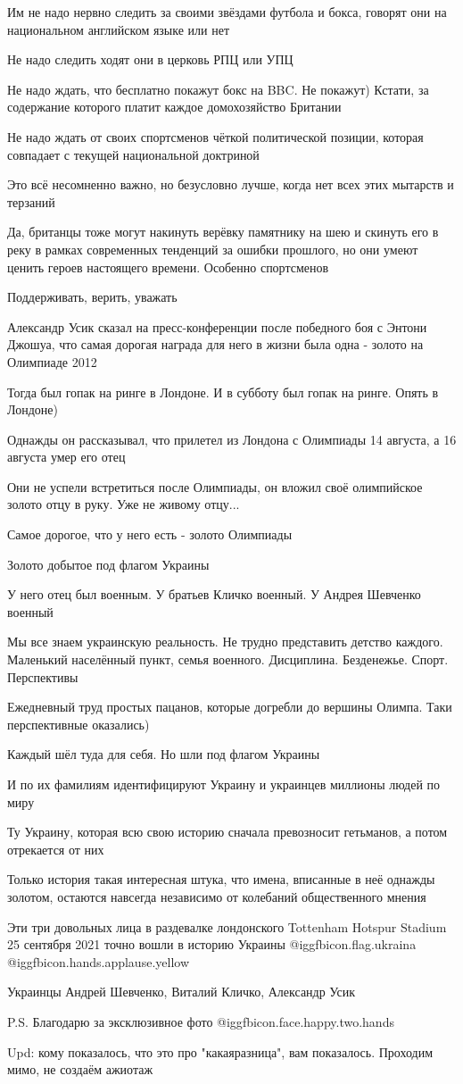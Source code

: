 Им не надо нервно следить за своими звёздами футбола и бокса, говорят они на
национальном английском языке или нет 

Не надо следить ходят они в церковь РПЦ или УПЦ

Не надо ждать, что бесплатно покажут бокс на BBC. Не покажут) Кстати, за
содержание которого платит каждое домохозяйство Британии

Не надо ждать от своих спортсменов чёткой политической позиции, которая
совпадает с текущей национальной доктриной

Это всё несомненно важно, но безусловно лучше, когда нет всех этих мытарств и
терзаний

Да, британцы тоже могут накинуть верёвку памятнику на шею и скинуть его в реку
в рамках современных тенденций за ошибки прошлого, но они умеют ценить героев
настоящего времени. Особенно спортсменов 

Поддерживать, верить, уважать 

Александр Усик сказал на пресс-конференции после победного боя с Энтони Джошуа,
что самая дорогая награда для него в жизни была одна - золото на Олимпиаде 2012

Тогда был гопак на ринге в Лондоне. И в субботу был гопак на ринге. Опять в
Лондоне) 

Однажды он рассказывал, что прилетел из Лондона с Олимпиады 14 августа, а 16
августа умер его отец

Они не успели встретиться после Олимпиады, он вложил своё олимпийское золото
отцу в руку. Уже не живому отцу...

Самое дорогое, что у него есть - золото Олимпиады 

Золото добытое под флагом Украины 

У него отец был военным. У братьев Кличко военный. У Андрея Шевченко военный

Мы все знаем украинскую реальность. Не трудно представить детство каждого.
Маленький населённый пункт, семья военного. Дисциплина. Безденежье. Спорт.
Перспективы 

Ежедневный труд простых пацанов, которые догребли до вершины Олимпа. Таки
перспективные оказались) 

Каждый шёл туда для себя. Но шли под флагом Украины 

И по их фамилиям идентифицируют Украину и украинцев миллионы людей по миру 

Ту Украину, которая всю свою историю сначала превозносит гетьманов, а потом
отрекается от них 

Только история такая интересная штука, что имена,  вписанные в неё однажды
золотом, остаются навсегда независимо от колебаний общественного мнения

Эти три довольных лица в раздевалке лондонского Tottenham Hotspur Stadium 25
сентября 2021 точно вошли в историю Украины  @igg{fbicon.flag.ukraina}
@igg{fbicon.hands.applause.yellow} 

Украинцы Андрей Шевченко, Виталий Кличко, Александр Усик

P.S. Благодарю за эксклюзивное фото  @igg{fbicon.face.happy.two.hands} 

Upd: кому показалось, что это про "какаяразница", вам показалось. Проходим
мимо, не создаём ажиотаж
